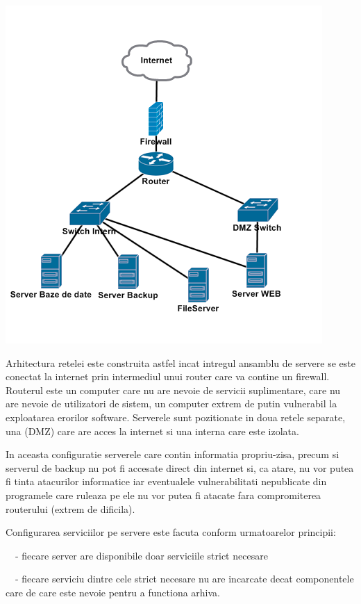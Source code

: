 \includegraphics[width=4.75in,height=5.0626in]{SecuritateaarhiveiRODA-img002.png}

Arhitectura retelei este construita astfel incat intregul ansamblu de servere se este conectat la internet prin
intermediul unui router care va contine un firewall. Routerul este un computer care nu are nevoie de servicii
suplimentare, care nu are nevoie de utilizatori de sistem, un computer extrem de putin vulnerabil la exploatarea
erorilor software. Serverele sunt pozitionate in doua retele separate, una (DMZ) care are acces la internet si una
interna care este izolata.

In aceasta configuratie serverele care contin informatia propriu-zisa, precum si serverul de backup nu pot fi accesate
direct din internet si, ca atare, nu vor putea fi tinta atacurilor informatice iar eventualele vulnerabilitati
nepublicate din programele care ruleaza pe ele nu vor putea fi atacate fara compromiterea routerului (extrem de
dificila).

Configurarea serviciilor pe servere este facuta conform urmatoarelor principii:

{\sffamily\color{black}
\ \ {}- fiecare server are disponibile doar serviciile strict necesare}

{\sffamily\color{black}
\ \ {}- fiecare serviciu dintre cele strict necesare nu are incarcate decat componentele care de care este nevoie pentru
a functiona arhiva.}

